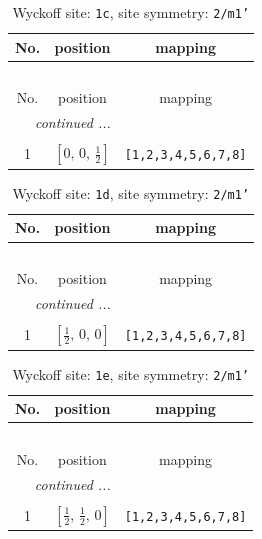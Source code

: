 \documentclass[fleqn,8pt]{jsarticle}
\begin{document}
\begin{longtable}{ccc}
\caption{Wyckoff site: {\tt 1c}, site symmetry: {\tt 2/m1'}}
 \\
 \hline \hline
No. & position & mapping \\ \hline \endfirsthead

\multicolumn{2}{l}{\tablename\ \thetable{}} \\
 \hline \hline
No. & position & mapping \\ \hline \endhead

 \hline \hline
\multicolumn{2}{r}{\footnotesize\it continued ...} \\ \endfoot

 \hline \hline
\multicolumn{2}{r}{} \\ \endlastfoot

1 & $\left[ 0,\, 0,\, \frac{1}{2} \right]$ & {\tt [1,2,3,4,5,6,7,8]} \\
\end{longtable}
\renewcommand{\arraystretch}{1.2}
\begin{longtable}{ccc}
\caption{Wyckoff site: {\tt 1d}, site symmetry: {\tt 2/m1'}}
 \\
 \hline \hline
No. & position & mapping \\ \hline \endfirsthead

\multicolumn{2}{l}{\tablename\ \thetable{}} \\
 \hline \hline
No. & position & mapping \\ \hline \endhead

 \hline \hline
\multicolumn{2}{r}{\footnotesize\it continued ...} \\ \endfoot

 \hline \hline
\multicolumn{2}{r}{} \\ \endlastfoot

1 & $\left[ \frac{1}{2},\, 0,\, 0 \right]$ & {\tt [1,2,3,4,5,6,7,8]} \\
\end{longtable}
\renewcommand{\arraystretch}{1.2}
\begin{longtable}{ccc}
\caption{Wyckoff site: {\tt 1e}, site symmetry: {\tt 2/m1'}}
 \\
 \hline \hline
No. & position & mapping \\ \hline \endfirsthead

\multicolumn{2}{l}{\tablename\ \thetable{}} \\
 \hline \hline
No. & position & mapping \\ \hline \endhead

 \hline \hline
\multicolumn{2}{r}{\footnotesize\it continued ...} \\ \endfoot

 \hline \hline
\multicolumn{2}{r}{} \\ \endlastfoot

1 & $\left[ \frac{1}{2},\, \frac{1}{2},\, 0 \right]$ & {\tt [1,2,3,4,5,6,7,8]} \\
\end{longtable}
\end{document}
